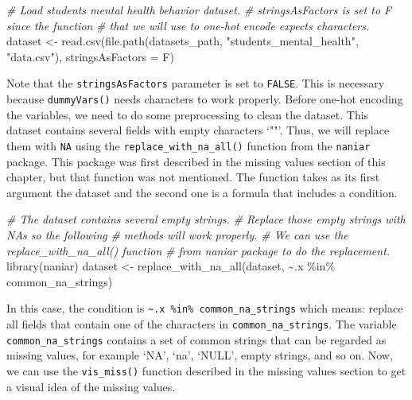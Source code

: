 \documentclass[
  11pt,
]{krantz}
\newenvironment{Shaded}{\begin{snugshade}}{\end{snugshade}}
\newcommand{\AttributeTok}[1]{\textcolor[rgb]{0.61,0.61,0.61}{#1}}
\newcommand{\CommentTok}[1]{\textcolor[rgb]{0.37,0.37,0.37}{\textit{#1}}}
\newcommand{\FunctionTok}[1]{\textcolor[rgb]{0,0,0}{#1}}
\newcommand{\NormalTok}[1]{#1}
\newcommand{\OtherTok}[1]{\textcolor[rgb]{0.37,0.37,0.37}{#1}}
\newcommand{\SpecialCharTok}[1]{\textcolor[rgb]{0,0,0}{#1}}
\newcommand{\StringTok}[1]{\textcolor[rgb]{0.5,0.5,0.5}{#1}}
\begin{document}
\begin{Shaded}
\begin{Highlighting}[]
\CommentTok{\# Load students mental health behavior dataset.}
\CommentTok{\# stringsAsFactors is set to F since the function}
\CommentTok{\# that we will use to one{-}hot encode expects characters.}
\NormalTok{dataset }\OtherTok{\textless{}{-}} \FunctionTok{read.csv}\NormalTok{(}\FunctionTok{file.path}\NormalTok{(datasets\_path,}
                              \StringTok{"students\_mental\_health"}\NormalTok{,}
                              \StringTok{"data.csv"}\NormalTok{),}
                              \AttributeTok{stringsAsFactors =}\NormalTok{ F)}
\end{Highlighting}
\end{Shaded}

Note that the \texttt{stringsAsFactors} parameter is set to \texttt{FALSE}. This is necessary because \texttt{dummyVars()} needs characters to work properly. Before one-hot encoding the variables, we need to do some preprocessing to clean the dataset. This dataset contains several fields with empty characters `""'. Thus, we will replace them with \texttt{NA} using the \texttt{replace\_with\_na\_all()} function from the \texttt{naniar} package. This package was first described in the missing values section of this chapter, but that function was not mentioned. The function takes as its first argument the dataset and the second one is a formula that includes a condition.

\begin{Shaded}
\begin{Highlighting}[]
\CommentTok{\# The dataset contains several empty strings.}
\CommentTok{\# Replace those empty strings with NAs so the following}
\CommentTok{\# methods will work properly.}
\CommentTok{\# We can use the replace\_with\_na\_all() function}
\CommentTok{\# from naniar package to do the replacement.}
\FunctionTok{library}\NormalTok{(naniar)}
\NormalTok{dataset }\OtherTok{\textless{}{-}} \FunctionTok{replace\_with\_na\_all}\NormalTok{(dataset,}
                               \SpecialCharTok{\textasciitilde{}}\NormalTok{.x }\SpecialCharTok{\%in\%}\NormalTok{ common\_na\_strings)}
\end{Highlighting}
\end{Shaded}

In this case, the condition is \texttt{\textasciitilde{}.x\ \%in\%\ common\_na\_strings} which means: replace all fields that contain one of the characters in \texttt{common\_na\_strings}. The variable \texttt{common\_na\_strings} contains a set of common strings that can be regarded as missing values, for example `NA', `na', `NULL', empty strings, and so on. Now, we can use the \texttt{vis\_miss()} function described in the missing values section to get a visual idea of the missing values.
\end{document}
